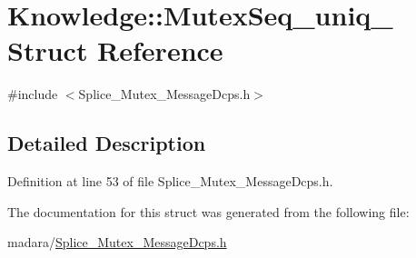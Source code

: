 \hypertarget{structKnowledge_1_1MutexSeq__uniq__}{
\section{Knowledge::MutexSeq\_\-uniq\_\- Struct Reference}
\label{de/de7/structKnowledge_1_1MutexSeq__uniq__}
}


{\ttfamily \#include $<$Splice\_\-Mutex\_\-MessageDcps.h$>$}



\subsection{Detailed Description}


Definition at line 53 of file Splice\_\-Mutex\_\-MessageDcps.h.



The documentation for this struct was generated from the following file:\begin{DoxyCompactItemize}
\item 
madara/\hyperlink{Splice__Mutex__MessageDcps_8h}{Splice\_\-Mutex\_\-MessageDcps.h}\end{DoxyCompactItemize}
